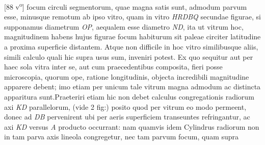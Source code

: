 [88 v\textsuperscript{o}] focum\protect{} circuli segmentorum, quae magna satis sunt, admodum parvum esse, minusque remotum ab ipso vitro, quam in vitro \textit{HRDBQ} secundae figurae, si supponamus diametrum \textit{OP}, aequalem esse diametro \textit{ND}, ita ut vitrum hoc, magnitudinem habens hujus figurae focum\protect{} habiturum sit paleae circiter latitudine a proxima superficie distantem. Atque non difficile in hoc vitro similibusque aliis, simili calculo quali hic supra usus sum, inveniri potest. Ex quo sequitur aut per haec sola vitra inter se, aut cum praecedentibus composita, fieri posse microscopia\protect{}, quorum ope, ratione longitudinis, objecta incredibili magnitudine apparere debent; imo etiam per unicum tale vitrum magna admodum ac distincta apparitura sunt.\pend \clearpage \pstart Praeteriri etiam hic non debet calculus congregationis radiorum axi \textit{KD} parallelorum, (vide 2 fig:) posito quod per vitrum eo modo permeent, donec ad  \textit{DB} pervenirent ubi per aeris superficiem transeuntes refringantur, ac axi \textit{KD} versus \textit{A} producto occurrant: nam quamvis idem Cylindrus radiorum non in tam parva axis lineola congregetur, nec tam parvum focum\protect{}, quam supra 